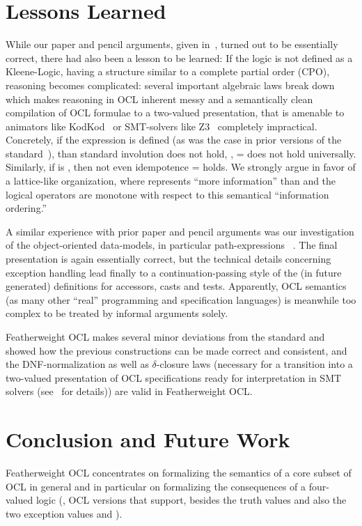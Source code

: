 \section{Lessons Learned}
While our paper and pencil arguments, given
in~\cite{brucker.ea:ocl-null:2009}, turned out to be essentially
correct, there had also been a lesson to be learned: If the logic is
not defined as a Kleene-Logic, having a structure similar to a
complete partial order (CPO), reasoning becomes complicated: several
important algebraic laws break down which makes reasoning in OCL
inherent messy and a semantically clean compilation of OCL formulae to
a two-valued presentation, that is amenable to animators like
KodKod~\cite{torlak.ea:kodkod:2007} or SMT-solvers like
Z3~\cite{moura.ea:z3:2008} completely impractical. Concretely, if the
expression  is defined  (as was
the case in prior versions of the standard~\cite{omg:ocl:2012}), than standard
involution does not hold, \ie,  = 
does not hold universally. Similarly, if  is
, then not even idempotence  =
 holds. We strongly argue in favor of a lattice-like
organization, where  represents ``more information''
than  and the logical operators are monotone with
respect to this semantical ``information ordering.''

A similar experience with prior paper and pencil arguments was our
investigation of the object-oriented data-models, in particular
path-expressions ~\cite{brucker.ea:path-expressions:2013}. The final
presentation is again essentially correct, but the technical details
concerning exception handling lead finally to a continuation-passing
style of the (in future generated) definitions for accessors, casts
and tests.  Apparently, OCL semantics (as many other ``real''
programming and specification languages) is meanwhile too complex to
be treated by informal arguments solely.

Featherweight OCL makes several minor deviations from the standard and
showed how the previous constructions can be made correct and
consistent, and the DNF-normalization as well as $\delta$-closure laws
(necessary for a transition into a two-valued presentation of OCL
specifications ready for interpretation in SMT solvers
(see~\cite{brucker.ea:ocl-testing:2010} for details)) are valid in
Featherweight OCL.

\section{Conclusion and Future Work}
Featherweight OCL concentrates on formalizing the semantics of a core
subset of OCL in general and in particular on formalizing the
consequences of a four-valued logic (\ie, OCL versions that support,
besides the truth values  and  also
the two exception values  and ).

